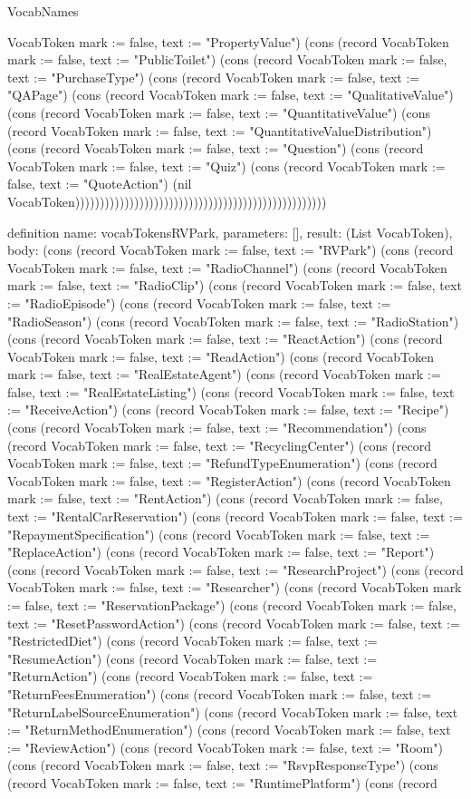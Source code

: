 \begin{lexlean}{VocabNames}
\begin{semanticmodule}
{VocabToken {mark := false, text := "PropertyValue"}) (cons (record VocabToken {mark := false, text := "PublicToilet"}) (cons (record VocabToken {mark := false, text := "PurchaseType"}) (cons (record VocabToken {mark := false, text := "QAPage"}) (cons (record VocabToken {mark := false, text := "QualitativeValue"}) (cons (record VocabToken {mark := false, text := "QuantitativeValue"}) (cons (record VocabToken {mark := false, text := "QuantitativeValueDistribution"}) (cons (record VocabToken {mark := false, text := "Question"}) (cons (record VocabToken {mark := false, text := "Quiz"}) (cons (record VocabToken {mark := false, text := "QuoteAction"}) (nil VocabToken)))))))))))))))))))))))))))))))))))))))))))))))))))
}

definition{
  name: vocabTokensRVPark,
  parameters: [],
  result: (List VocabToken),
  body: (cons (record VocabToken {mark := false, text := "RVPark"}) (cons (record VocabToken {mark := false, text := "RadioChannel"}) (cons (record VocabToken {mark := false, text := "RadioClip"}) (cons (record VocabToken {mark := false, text := "RadioEpisode"}) (cons (record VocabToken {mark := false, text := "RadioSeason"}) (cons (record VocabToken {mark := false, text := "RadioStation"}) (cons (record VocabToken {mark := false, text := "ReactAction"}) (cons (record VocabToken {mark := false, text := "ReadAction"}) (cons (record VocabToken {mark := false, text := "RealEstateAgent"}) (cons (record VocabToken {mark := false, text := "RealEstateListing"}) (cons (record VocabToken {mark := false, text := "ReceiveAction"}) (cons (record VocabToken {mark := false, text := "Recipe"}) (cons (record VocabToken {mark := false, text := "Recommendation"}) (cons (record VocabToken {mark := false, text := "RecyclingCenter"}) (cons (record VocabToken {mark := false, text := "RefundTypeEnumeration"}) (cons (record VocabToken {mark := false, text := "RegisterAction"}) (cons (record VocabToken {mark := false, text := "RentAction"}) (cons (record VocabToken {mark := false, text := "RentalCarReservation"}) (cons (record VocabToken {mark := false, text := "RepaymentSpecification"}) (cons (record VocabToken {mark := false, text := "ReplaceAction"}) (cons (record VocabToken {mark := false, text := "Report"}) (cons (record VocabToken {mark := false, text := "ResearchProject"}) (cons (record VocabToken {mark := false, text := "Researcher"}) (cons (record VocabToken {mark := false, text := "ReservationPackage"}) (cons (record VocabToken {mark := false, text := "ResetPasswordAction"}) (cons (record VocabToken {mark := false, text := "RestrictedDiet"}) (cons (record VocabToken {mark := false, text := "ResumeAction"}) (cons (record VocabToken {mark := false, text := "ReturnAction"}) (cons (record VocabToken {mark := false, text := "ReturnFeesEnumeration"}) (cons (record VocabToken {mark := false, text := "ReturnLabelSourceEnumeration"}) (cons (record VocabToken {mark := false, text := "ReturnMethodEnumeration"}) (cons (record VocabToken {mark := false, text := "ReviewAction"}) (cons (record VocabToken {mark := false, text := "Room"}) (cons (record VocabToken {mark := false, text := "RsvpResponseType"}) (cons (record VocabToken {mark := false, text := "RuntimePlatform"}) (cons (record }
\end{semanticmodule}
\end{lexlean}
